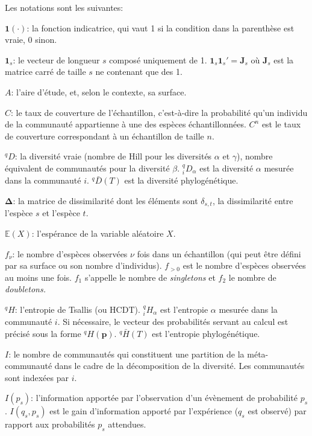 \documentclass[
  11pt,
  american,
  a4paper,
  extrafontsizes,onecolumn,openright
  ]{memoir}
\newlength{\rf}
\begin{document}
Les notations sont les suivantes:

\noindent \({\mathbf 1}(\cdot)\): la fonction indicatrice, qui vaut 1 si la condition dans la parenthèse est vraie, 0 sinon.

\noindent \(\mathbf{1}_s\): le vecteur de longueur \(s\) composé uniquement de 1. \(\mathbf{1}_s\mathbf{1}_s'=\mathbf{J}_s\) où \(\mathbf{J}_s\) est la matrice carré de taille \(s\) ne contenant que des 1.

\noindent \(A\): l'aire d'étude, et, selon le contexte, sa surface.

\noindent \(C\): le taux de couverture de l'échantillon, c'est-à-dire la probabilité qu'un individu de la communauté appartienne à une des espèces échantillonnées.
\(C^{n}\) est le taux de couverture correspondant à un échantillon de taille \(n\).

\noindent \(^{q}\!D\): la diversité vraie (nombre de Hill pour les diversités \(\alpha\) et \(\gamma\)), nombre équivalent de communautés pour la diversité \(\beta\).
\(^{q}_{i}\!D_{\alpha}\) est la diversité \(\alpha\) mesurée dans la communauté \(i\).
\(^{q}\!\bar{D}\left(T\right)\) est la diversité phylogénétique.

\noindent \(\boldsymbol{\Delta}\): la matrice de dissimilarité dont les éléments sont \(\delta_{s,t}\), la dissimilarité entre l'espèce \(s\) et l'espèce \(t\).

\noindent \({\mathbb E}\left(X\right)\): l'espérance de la variable aléatoire \(X\).

\noindent \(f_{\nu}\): le nombre d'espèces observées \(\nu\) fois dans un échantillon (qui peut être défini par sa surface ou son nombre d'individus).
\(f_{>0}\) est le nombre d'espèces observées au moins une fois.
\(f_1\) s'appelle le nombre de \emph{singletons} et \(f_2\) le nombre de \emph{doubletons.}

\noindent \(^{q}\!H\): l'entropie de Tsallis (ou HCDT).
\(^{q}_{i}\!H_{\alpha}\) est l'entropie \(\alpha\) mesurée dans la communauté \(i\).
Si nécessaire, le vecteur des probabilités servant au calcul est précisé sous la forme \(^{q}\!H(\mathbf{p})\).
\(^{q}\!\bar{H}(T)\) est l'entropie phylogénétique.

\noindent \(I\): le nombre de communautés qui constituent une partition de la méta-communauté dans le cadre de la décomposition de la diversité.
Les communautés sont indexées par \(i\).

\noindent \(I(p_s)\): l'information apportée par l'observation d'un évènement de probabilité \(p_s\).
\(I(q_s,p_s)\) est le gain d'information apporté par l'expérience (\(q_s\) est observé) par rapport aux probabilités \(p_s\) attendues.
\end{document}
